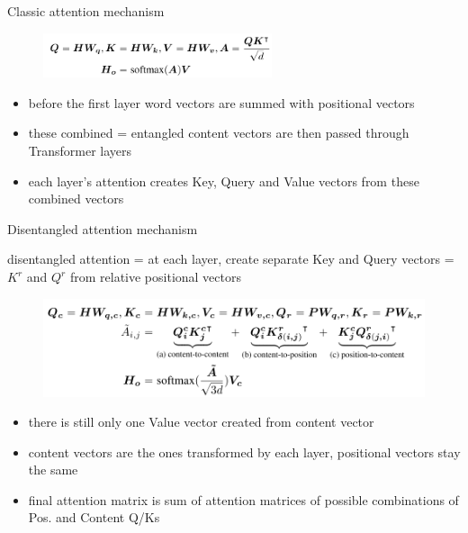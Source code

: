 \documentclass{beamer}
\begin{document}
\begin{frame}{Classic attention mechanism}


\begin{figure}[h]
\includegraphics[width=0.6\textwidth]{img/att}
\end{figure}

\begin{itemize}
\item before the first layer word vectors are summed with positional vectors
\item these combined = entangled content vectors are then passed through Transformer layers
\item each layer's attention creates Key, Query and Value vectors from these combined vectors
\end{itemize}

\end{frame}
\begin{frame}{Disentangled attention mechanism}


disentangled attention = at each layer, create separate Key and Query vectors = $K^r$ and $Q^r$ from relative positional vectors 
\begin{figure}[h]
\includegraphics[width=\textwidth]{img/att2}
\end{figure}

\begin{itemize}
\item there is still only one Value vector created from content vector
\item content vectors are the ones transformed by each layer, positional vectors stay the same
\item final attention matrix is sum of attention matrices of possible combinations of Pos. and Content Q/Ks
\end{itemize}

\end{frame}
\end{document}

